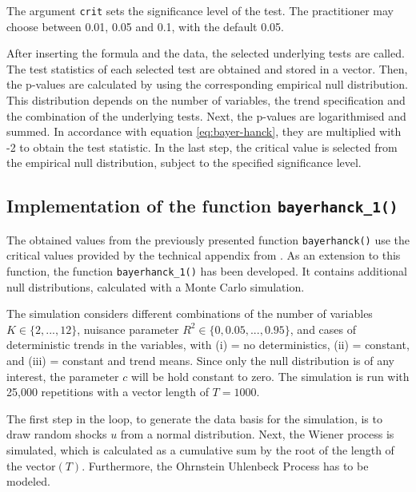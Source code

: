 \documentclass[12pt,a4paper]{article}
\begin{document}
The argument \texttt{crit} sets the significance level of the test. The
practitioner may choose between 0.01, 0.05 and 0.1, with the default
0.05.

After inserting the formula and the data, the selected underlying tests
are called. The test statistics of each selected test are obtained and
stored in a vector. Then, the p-values are calculated by using the
corresponding empirical null distribution. This distribution depends on
the number of variables, the trend specification and the combination of
the underlying tests. Next, the p-values are logarithmised and summed.
In accordance with equation \eqref{eq:bayer-hanck}, they are multiplied
with -2 to obtain the test statistic. In the last step, the critical
value is selected from the empirical null distribution, subject to the
specified significance level.

\hypertarget{implementation-of-the-function-bayerhanck_1}{%
\subsection{\texorpdfstring{Implementation of the function
\texttt{bayerhanck\_1()}}{Implementation of the function bayerhanck\_1()}}\label{implementation-of-the-function-bayerhanck_1}}

The obtained values from the previously presented function
\texttt{bayerhanck()} use the critical values provided by the technical
appendix from \textcite{Bayerhanck2009}. As an extension to this
function, the function \texttt{bayerhanck\_1()} has been developed. It
contains additional null distributions, calculated with a Monte Carlo
simulation.

The simulation considers different combinations of the number of
variables \(K\in\{2,...,12\}\), nuisance parameter
\(R^2\in\{0,0.05,...,0.95\}\), and cases of deterministic trends in the
variables, with (i) = no deterministics, (ii) = constant, and (iii) =
constant and trend means. Since only the null distribution is of any
interest, the parameter \(c\) will be hold constant to zero. The
simulation is run with 25,000 repetitions with a vector length of
\(T = 1000\).

The first step in the loop, to generate the data basis for the
simulation, is to draw random shocks \(u\) from a normal distribution.
Next, the Wiener process is simulated, which is calculated as a
cumulative sum by the root of the length of the vector\((T)\).
Furthermore, the Ohrnstein Uhlenbeck Process has to be modeled.
\end{document}
